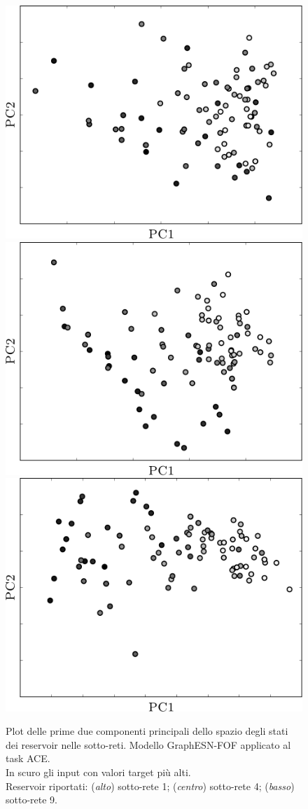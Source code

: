 \begin{figure}[p]
\centering
\includegraphics[width=0.5\columnwidth]{img/pca/pca-ace-fof1}\\
\vspace*{0.8cm}
\includegraphics[width=0.5\columnwidth]{img/pca/pca-ace-fof2}\\
\vspace*{0.8cm}
\includegraphics[width=0.5\columnwidth]{img/pca/pca-ace-fof3}\\
\medskip
\caption[PCA dei reservoir. GraphESN-FOF su ACE.]{Plot delle prime due componenti principali dello spazio degli stati dei reservoir nelle sotto-reti. Modello GraphESN-FOF applicato al task ACE.\\ 
In scuro gli input con valori target più alti.\\
Reservoir riportati: (\emph{alto}) sotto-rete 1; (\emph{centro}) sotto-rete 4; (\emph{basso}) sotto-rete 9.}
\label{fig:esperimenti:pca-ace-fof}
\end{figure}
